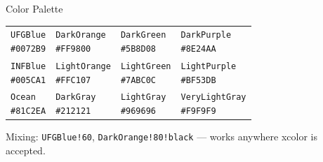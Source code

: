 \documentclass[aspectratio=169,t,xcolor=table]{beamer}
\begin{document}
\begin{frame}{Color Palette}

    \renewcommand{\arraystretch}{1.6}
    \setlength{\tabcolsep}{4pt}
    \begin{tabular}{p{2.8cm}p{2.8cm}p{2.8cm}p{2.8cm}}
        \cellcolor{UFGBlue}{\color{white}\small\texttt{UFGBlue}\newline\tiny\texttt{\#0072B9}} &
        \cellcolor{DarkOrange}{\color{DarkGray}\small\texttt{DarkOrange}\newline\tiny\texttt{\#FF9800}} &
        \cellcolor{DarkGreen}{\color{white}\small\texttt{DarkGreen}\newline\tiny\texttt{\#5B8D08}} &
        \cellcolor{DarkPurple}{\color{white}\small\texttt{DarkPurple}\newline\tiny\texttt{\#8E24AA}} \\
        \cellcolor{INFBlue}{\color{white}\small\texttt{INFBlue}\newline\tiny\texttt{\#005CA1}} &
        \cellcolor{LightOrange}{\color{DarkGray}\small\texttt{LightOrange}\newline\tiny\texttt{\#FFC107}} &
        \cellcolor{LightGreen}{\color{DarkGray}\small\texttt{LightGreen}\newline\tiny\texttt{\#7ABC0C}} &
        \cellcolor{LightPurple}{\color{white}\small\texttt{LightPurple}\newline\tiny\texttt{\#BF53DB}} \\
        \cellcolor{Ocean}{\color{DarkGray}\small\texttt{Ocean}\newline\tiny\texttt{\#81C2EA}} &
        \cellcolor{DarkGray}{\color{white}\small\texttt{DarkGray}\newline\tiny\texttt{\#212121}} &
        \cellcolor{LightGray}{\color{DarkGray}\small\texttt{LightGray}\newline\tiny\texttt{\#969696}} &
        \cellcolor{VeryLightGray}{\color{DarkGray}\small\texttt{VeryLightGray}\newline\tiny\texttt{\#F9F9F9}} \\
    \end{tabular}

    \vspace{0.5em}
    {\small Mixing: \texttt{UFGBlue!60}, \texttt{DarkOrange!80!black} — works anywhere xcolor is accepted.}

\end{frame}
\end{document}
